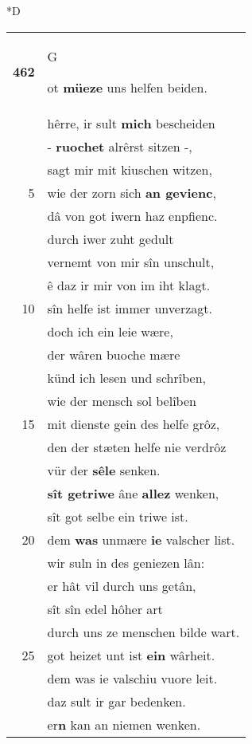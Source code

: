 \documentclass[8pt,a4paper,notitlepage]{article}
\begin{document}
\begin{table}[ht]
\begin{minipage}[t]{0.5\linewidth}
\small
\begin{center}*D
\end{center}
\begin{tabular}{rl}
\textbf{462} & \begin{large}G\end{large}ot \textbf{müeze} uns helfen beiden.\\ 
 & hêrre, ir sult \textbf{mich} bescheiden\\ 
 & - \textbf{ruochet} alrêrst sitzen -,\\ 
 & sagt mir mit kiuschen witzen,\\ 
5 & wie der zorn sich \textbf{an gevienc},\\ 
 & dâ von got iwern haz enpfienc.\\ 
 & durch iwer zuht gedult\\ 
 & vernemt von mir sîn unschult,\\ 
 & ê daz ir mir von im iht klagt.\\ 
10 & sîn helfe ist immer unverzagt.\\ 
 & doch ich ein leie wære,\\ 
 & der wâren buoche mære\\ 
 & künd ich lesen und schrîben,\\ 
 & wie der mensch sol belîben\\ 
15 & mit dienste gein des helfe grôz,\\ 
 & den der stæten helfe nie verdrôz\\ 
 & vür der \textbf{sêle} senken.\\ 
 & \textbf{sît getriwe} âne \textbf{allez} wenken,\\ 
 & sît got selbe ein triwe ist.\\ 
20 & dem \textbf{was} unmære \textbf{ie} valscher list.\\ 
 & wir suln in des geniezen lân:\\ 
 & er hât vil durch uns getân,\\ 
 & sît sîn edel hôher art\\ 
 & durch uns ze menschen bilde wart.\\ 
25 & got heizet unt ist \textbf{ein} wârheit.\\ 
 & dem was ie valschiu vuore leit.\\ 
 & daz sult ir gar bedenken.\\ 
 & er\textbf{n} kan an niemen wenken.\\ 

\end{tabular}
\end{minipage}
\end{table}
\end{document}
